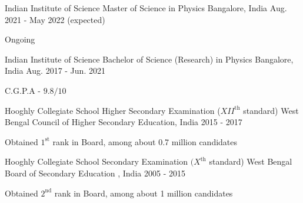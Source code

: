 

\begin{cventries}

    \cventry
	{Indian Institute of Science} %
	{Master of Science in Physics} %
	{Bangalore, India} %
	{Aug. 2021 - May 2022 (expected)} %
	{
	\begin{cvitems} %
		\item {Ongoing}
	\end{cvitems}
	}

  \cventry
    {Indian Institute of Science} %
    {Bachelor of Science (Research) in Physics} %
    {Bangalore, India} %
    {Aug. 2017 - Jun. 2021} %
    {
      \begin{cvitems} %
        \item {C.G.P.A - $9.8/10$}
      \end{cvitems}
    }

  \cventry
	{Hooghly Collegiate School} %
	{Higher Secondary Examination ($XII^{\text{th}}$ standard)} %
	{West Bengal Council of Higher Secondary Education, India} %
	{2015 - 2017} %
	{
	\begin{cvitems} %
		\item {Obtained $1^{\text{st}}$ rank in Board, among about 0.7 million candidates}
	\end{cvitems}
	}
  \cventry
	{Hooghly Collegiate School} %
	{Secondary Examination $(X^{\text{th}}$ standard)} %
	{West Bengal Board of Secondary Education , India} %
	{2005 - 2015} %
	{
	\begin{cvitems} %
		\item {Obtained $2^{\text{nd}}$ rank in Board, among about 1 million candidates}
	\end{cvitems}
	}


\end{cventries}
